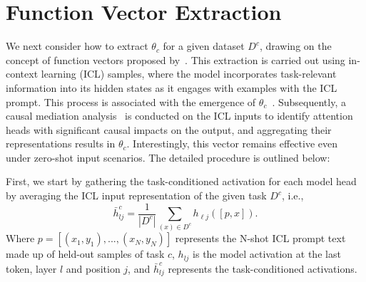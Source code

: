 
\section{Function Vector Extraction}
\label{sec3.2}
We next consider how to extract $\theta_c$ for a given dataset $D^{c}$, drawing on the concept of function vectors proposed by~\citet{todd2023function}. This extraction is carried out using in-context learning (ICL) samples, where the model incorporates task-relevant information into its hidden states as it engages with examples with the ICL prompt. This process is associated with the emergence of $\theta_c$~\citep{todd2023function, hendel2023context}. Subsequently, a causal mediation analysis~\citep{Pearl2013InterpretationAI, NEURIPS2020_92650b2e, li2024understanding} is conducted on the ICL inputs to identify attention heads with significant causal impacts on the output, and aggregating their representations results in $\theta_c$. Interestingly, this vector remains effective even under zero-shot input scenarios. The detailed procedure is outlined below:

First, we start by gathering the task-conditioned activation for each model head by averaging the ICL input representation of the given task $D^{c}$, i.e., 
\begin{equation}
    \bar{h}_{l j}^c=\frac{1}{\left|D^{c}\right|} \sum_{(x) \in D^{c}} h_{\ell j}\left([p, x]\right).
\end{equation}
Where $p = [(x_1, y_1), ..., (x_N, y_N)]$ represents the N-shot ICL prompt text made up of held-out samples of task $c$, ${h}_{lj}$ is the model activation at the last token, layer $l$ and position $j$, and $\bar{h}_{lj}^c$ represents the task-conditioned activations.

